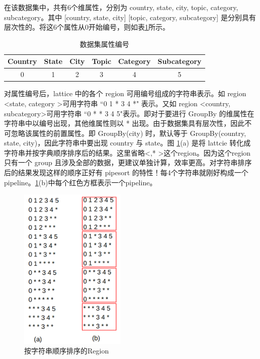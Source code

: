 在该数据集中，共有6个维属性，分别为 country, state, city, topic, category, subcategory。其中 [country, state, city] [topic, category, subcategory] 是分别具有层次性的。将这6个属性从0开始编号，则如表\ref{attribute_no}所示。

\begin{table}[!ht]
\begin{center}
\begin{tabular}{|c|c|c|c|c|c|}
\hline 
Country & State & City & Topic & Category & Subcategory \\ 
\hline 
0 & 1 & 2 & 3 & 4 & 5 \\ 
\hline 
\end{tabular} 
\end{center}
\caption{数据集属性编号}\label{attribute_no}
\end{table}

对属性编号后，lattice 中的各个 region 可用编号组成的字符串表示。如 region \textless state, category \textgreater 可用字符串 ``0 1 * 3 4 *" 表示。又如 region \textless country, subcategory\textgreater 可用字符串 ``0 * * 3 4 5"表示。即对于要进行 GroupBy 的维属性在字符串中以编号出现，其他维属性则以 * 出现。由于数据集具有层次性，因此不可忽略该属性的前置属性。即 GroupBy(city) 时，默认等于 GroupBy(country, state, city)，因此字符串中要出现 country 与 state。图 \ref{sorted_region}(a) 是将 lattcie 转化成字符串并按字典顺序排序后的结果。这里省略\textless *,* \textgreater 这个region。因为这个region只有一个 group 且涉及全部的数据，更建议单独计算，效率更高。对字符串排序后的结果发现这样的顺序正好有 pipesort 的特性！每4个字符串就刚好构成一个pipeline。\ref{sorted_region}(b)中每个红色方框表示一个pipeline。

\begin{figure}[!ht] 
\centering\includegraphics[width=2in]{picture/ch_terasort_mr/sorted_region} 
\caption{按字符串顺序排序的Region}\label{sorted_region} 
\end{figure}

